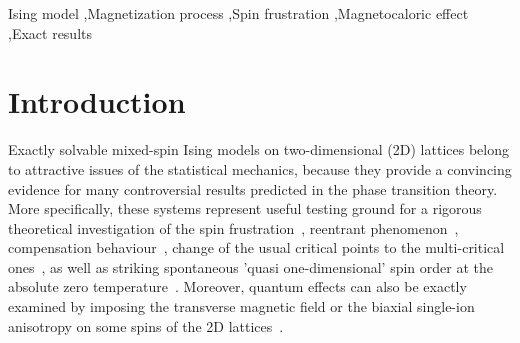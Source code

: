 \documentclass[final,5p,times,sort&compress]{elsarticle}
\begin{document}
\begin{frontmatter}
\begin{keyword}
Ising model \sep Magnetization process \sep Spin frustration \sep Magnetocaloric effect \sep Exact results



\end{keyword}

\end{frontmatter}



\section{Introduction}
\label{sec:1}

Exactly solvable mixed-spin Ising models on two-dimen\-sional (2D) lattices belong to attractive issues of the statistical mechanics, because they provide a convincing evidence for many controversial results predicted in the phase transition theory. More specifically, these systems represent useful testing ground for a rigorous theoretical investigation of the spin frustration~\cite{Gon87, Str06b, Str12, Str13, Poh16, Fis60a, Fis60b, Hat68, Mas73, Gia88, Aza88, Lu05, Can06, Gal16}, reentrant phenomenon~\cite{Gon87, Str06b, Str12, Str13, Poh16, Mas73, Gal16, Mat07, Str06a, Jas05b}, compensation behaviour~\cite{Str04, Jas05b, Str12, Mat07, Lac04, Kar15}, change of the usual critical points to the multi-critical ones~\cite{Str06b, Str06a, Lip95, Hin05, Kar15}, as well as striking spontaneous 'quasi one-dimensional' spin order at the absolute zero temperature~\cite{Str07, Can08}. Moreover, quantum effects can also be exactly examined by imposing the transverse magnetic field or the biaxial single-ion anisotropy on some spins of the 2D lattices~\cite{Lac04, Str03, Str04, Jas05a, Jas05b, Eki09}.
\end{document}

